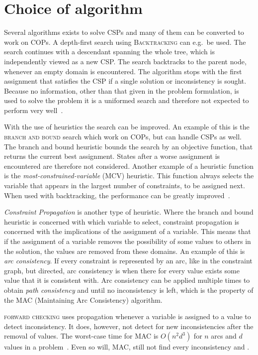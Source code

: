 \section{Choice of algorithm}
Several algorithms exists to solve CSPs and many of them can be converted to work on COPs. A depth-first search using \textsc{Backtracking} can e.g.\ be used. The search continues with a descendant spanning the whole tree, which is independently viewed as a new CSP. The search backtracks to the parent node, whenever an empty domain is encountered. The algorithm stops with the first assignment that satisfies the CSP if a single solution or inconsistency is sought. Because no information, other than that given in the problem formulation, is used to solve the problem it is a uniformed search and therefore not expected to perform very well~\cite[p. 73]{AIRussell}.

With the use of heuristics the search can be improved. An example of this is the \textsc{branch and bound} search which work on COPs, but can handle CSPs as well. The branch and bound heuristic bounds the search by an objective function, that returns the current best assignment. States after a worse assignment is encountered are therefore not considered. Another example of a heuristic function is the \emph{most-constrained-variable} (MCV) heuristic. This function always selects the variable that appears in the largest number of constraints, to be assigned next. When used with backtracking, the performance can be greatly improved~\cite[pp. 337]{CPApt}.

\emph{Constraint Propagation} is another type of heuristic. Where the branch and bound heuristic is concerned with which variable to select, constraint propagation is concerned with the implications of the assignment of a variable. This means that if the assignment of a variable removes the possibility of some values to others in the solution, the values are removed from these domains. An example of this is \emph{arc consistency}. If every constraint is represented by an arc, like in the constraint graph, but directed, arc consistency is when there for every value exists some value that it is consistent with. Arc consistency can be applied multiple times to obtain \textit{path consistency} and until no inconsistency is left, which is the property of the \textsc{MAC} (Maintaining Arc Consistency) algorithm.

\textsc{forward checking} uses propagation whenever a variable is assigned to a value to detect inconsistency. It does, however, not detect for new inconsistencies after the removal of values. The worst-case time for \textsc{MAC} is $O(n^2d^3)$ for $n$ arcs and $d$ values in a problem~\cite[p. 146]{AIRussell}. Even so will, \textsc{MAC}, still not find every inconsistency \cite[p. 150]{CPApt} and \cite[p. 147]{AIRussell}.


